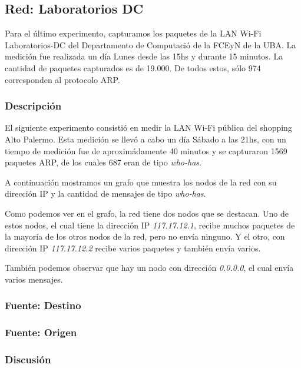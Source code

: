 \subsection{Red: Laboratorios DC}

Para el último experimento, capturamos los paquetes de la LAN Wi-Fi Laboratorios-DC del Departamento de Computació de la FCEyN de la UBA. La medición fue realizada un día Lunes desde las 15hs y durante 15 minutos. La cantidad de paquetes capturados es de 19.000. De todos estos, sólo 974 corresponden al protocolo ARP.

\subsubsection{Descripción}

El siguiente experimento consistió en medir la LAN Wi-Fi pública del shopping Alto Palermo. Esta medición se llevó a cabo un día Sábado a las 21hs, con un tiempo de medición fue de aproximádamente 40 minutos y se capturaron 1569 paquetes ARP, de los cuales 687 eran de tipo \emph{who-has}.

A continuación mostramos un grafo que muestra los nodos de la red con su dirección IP y la cantidad de mensajes de tipo \emph{who-has}.


Como podemos ver en el grafo, la red tiene dos nodos que se destacan. Uno de estos nodos, el cual tiene la dirección IP \emph{117.17.12.1}, recibe muchos paquetes de la mayoría de los otros nodos de la red, pero no envía ninguno. Y el otro, con dirección IP \emph{117.17.12.2} recibe varios paquetes y también envía varios.

También podemos observar que hay un nodo con dirección \emph{0.0.0.0}, el cual envía varios mensajes. %

\subsubsection{Fuente: Destino}


\subsubsection{Fuente: Origen}



\subsubsection{Discusión}
